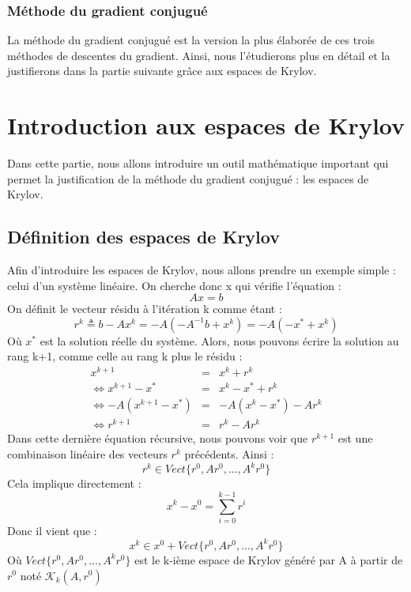 \subsubsection{Méthode du gradient conjugué}
La méthode du gradient conjugué est la version la plus élaborée de ces trois méthodes de descentes du gradient. Ainsi, nous l'étudierons plus en détail et la justifierons dans la partie suivante grâce aux espaces de Krylov.
\section{Introduction aux espaces de Krylov}
Dans cette partie, nous allons introduire un outil mathématique important qui permet la justification de la méthode du gradient conjugué : les espaces de Krylov. 
\subsection{Définition des espaces de Krylov}
Afin d'introduire les espaces de Krylov, nous allons prendre un exemple simple : celui d'un système linéaire. On cherche donc x qui vérifie l'équation : 
\begin{equation}
Ax = b
\end{equation}
On définit le vecteur résidu à l'itération k comme étant : 
\begin{equation}
r^k \triangleq b - Ax^k = -A ( - A^{-1}b + x^k) = -A (- x^* + x^k)
\end{equation}
Où $x^*$ est la solution réelle du système. Alors, nous pouvons écrire la solution au rang k+1, comme celle au rang k plus le résidu : 
\begin{eqnarray}
x^{k+1} &=& x^k + r^k\\
\Leftrightarrow x^{k+1} - x^* &=& x^k - x^* + r^k\\
\Leftrightarrow -A( x^{k+1} - x^*) &=& -A(x^k - x^*) - Ar^k\\
\Leftrightarrow r^{k+1} &=& r^k - Ar^k
\end{eqnarray}
Dans cette dernière équation récursive, nous pouvons voir que $r^{k+1}$ est une combinaison linéaire des vecteurs $r^k$ précédents. Ainsi :
\begin{equation}
r^k \in Vect\{r^0, Ar^0, ..., A^kr^0\}
\end{equation}
Cela implique directement : 
\begin{equation}
x^k - x^0 = \sum_{i = 0}^{k-1}r^i
\end{equation}
Donc il vient que : 
\begin{equation}
x^k \in x^0 + Vect\{r^0, Ar^0, ..., A^kr^0\}
\end{equation}
Où $Vect\{r^0, Ar^0, ..., A^kr^0\}$ est le k-ième espace de Krylov généré par A à partir de $r^0$ noté $\mathcal{K}_k(A, r^0)$
